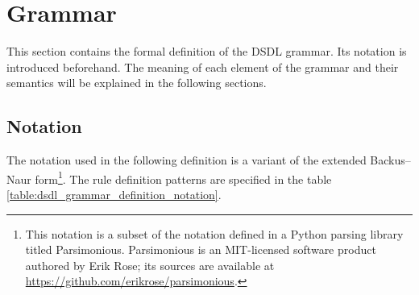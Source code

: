 \section{Grammar}

This section contains the formal definition of the DSDL grammar.
Its notation is introduced beforehand.
The meaning of each element of the grammar and their semantics will be explained in the following sections.

\subsection{Notation}

The notation used in the following definition is a variant of the extended Backus--Naur
form\footnote{This notation is a subset of the notation defined in a Python parsing library titled Parsimonious.
Parsimonious is an MIT-licensed software product authored by Erik Rose;
its sources are available at \url{https://github.com/erikrose/parsimonious}.}.
The rule definition patterns are specified in the table \ref{table:dsdl_grammar_definition_notation}.


